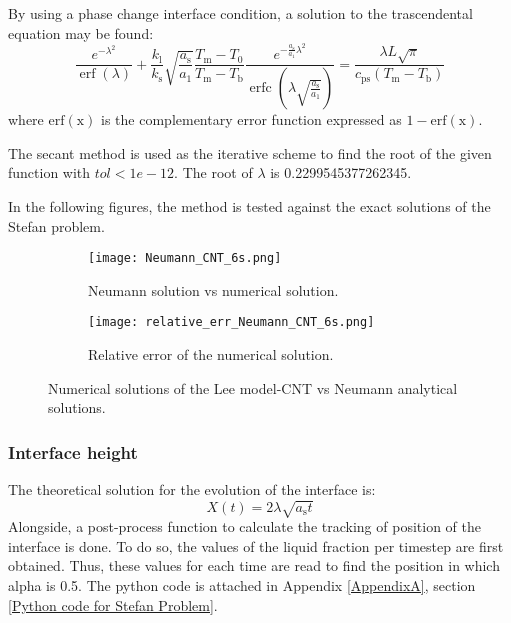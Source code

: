 By using a phase change interface condition, a solution to the trascendental equation may be found:
\begin{equation}
	\frac{e^{-\lambda^{2}}}{\operatorname{erf}(\lambda)}+\frac{k_{\mathrm{l}}}{k_{\mathrm{s}}} \sqrt{\frac{a_{\mathrm{s}}}{a_{1}}} \frac{T_{\mathrm{m}}-T_{0}}{T_{\mathrm{m}}-T_{\mathrm{b}}} \frac{e^{-\frac{a_{\mathrm{s}}}{a_{1}} \lambda^{2}}}{\operatorname{erfc}\left(\lambda \sqrt{\frac{a_{\mathrm{s}}}{a_{1}}}\right)}=\frac{\lambda L \sqrt{\pi}}{c_{\mathrm{ps}}\left(T_{\mathrm{m}}-T_{\mathrm{b}}\right)}
	\label{3.48}
\end{equation}
where ${\operatorname{erf(x)}}$ is the complementary error function expressed as $1-{\operatorname{erf(x)}}$.
	
\noindent The secant method is used as the iterative scheme to find the root of the given function with $tol<1e-12$. The root of $\lambda$ is 0.2299545377262345.

\noindent In the following figures, the method is tested against the exact solutions of the Stefan problem. 

\begin{figure}[h!]
	\begin{subfigure}{0.50\textwidth}
		\centering
		\texttt{[image: Neumann\_CNT\_6s.png]}\hfill
		\caption{Neumann solution vs numerical solution.} \label{3.15figa}
	\end{subfigure}
	\hfill
	\begin{subfigure}{0.50\textwidth}
		\centering
		\texttt{[image: relative\_err\_Neumann\_CNT\_6s.png]}	
		\caption{Relative error of the numerical solution.}\label{3.15figb}
	\end{subfigure}
	\caption{Numerical solutions of the Lee model-CNT vs Neumann analytical solutions.}
	\label{3.15fig}
\end{figure}

\subsubsection{Interface height}

\setlength{\parindent}{0.5cm} The theoretical solution for the evolution of the interface is:
\begin{equation}
	X(t)=2 \lambda \sqrt{a_{\mathrm{s}} t}
	\label{3.49}
\end{equation}
Alongside, a post-process function to calculate the tracking of position of the interface is done. To do so, the values of the liquid fraction per timestep are first obtained. Thus, these values for each time are read to find the position in which alpha is 0.5. The python code is attached in Appendix \ref{AppendixA}, section \ref{Python code for Stefan Problem}.

